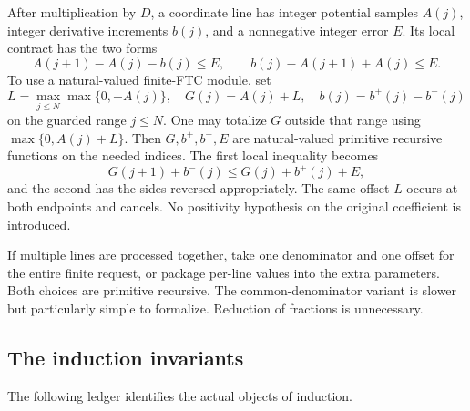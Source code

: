 After multiplication by $D$, a coordinate line has integer potential
samples $A(j)$, integer derivative increments $b(j)$, and a nonnegative
integer error $E$. Its local contract has the two forms
\[
 A(j+1)-A(j)-b(j)\le E,\qquad
 b(j)-A(j+1)+A(j)\le E.
\]
To use a natural-valued finite-FTC module, set
\[
 L=\max_{j\le N}\max\{0,-A(j)\},\quad
 G(j)=A(j)+L,\quad b(j)=b^+(j)-b^-(j)
\]
on the guarded range $j\le N$. One may totalize $G$ outside that range
using $\max\{0,A(j)+L\}$.
Then $G,b^+,b^-,E$ are natural-valued primitive recursive functions
on the needed indices. The first local inequality becomes
\[
 G(j+1)+b^-(j)\le G(j)+b^+(j)+E,
\]
and the second has the sides reversed appropriately.
The same offset $L$ occurs at both endpoints and cancels.
No positivity hypothesis on the original coefficient is introduced.

If multiple lines are processed together, take one denominator and one
offset for the entire finite request, or package per-line values into
the extra parameters. Both choices are primitive recursive. The
common-denominator variant is slower but particularly simple to
formalize. Reduction of fractions is unnecessary.

\subsection{The induction invariants}

The following ledger identifies the actual objects of induction.

